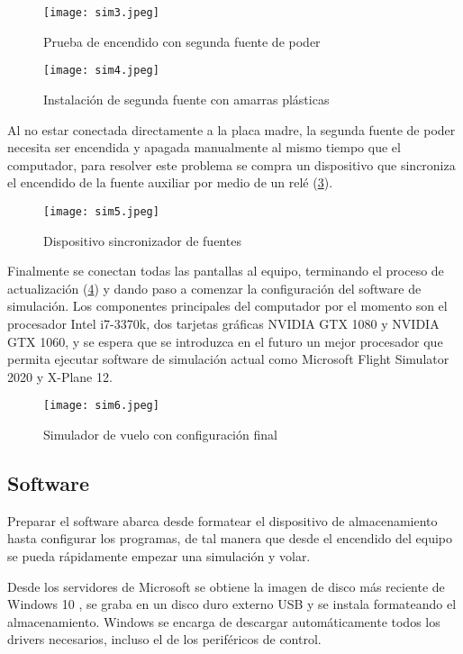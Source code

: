 \begin{figure}[h]
	\centering
	\texttt{[image: sim3.jpeg]}
	\caption{Prueba de encendido con segunda fuente de poder}
	\label{fig:sim3}
\end{figure}

\begin{figure}[h]
	\centering
	\texttt{[image: sim4.jpeg]}
	\caption{Instalación de segunda fuente con amarras plásticas}
	\label{fig:sim4}
\end{figure}

Al no estar conectada directamente a la placa madre, la segunda fuente de poder necesita ser encendida y apagada manualmente al mismo tiempo que el computador, para resolver este problema se compra un dispositivo que sincroniza el encendido de la fuente auxiliar por medio de un relé (\ref{fig:sim5}).

\begin{figure}[h]
	\centering
	\texttt{[image: sim5.jpeg]}
	\caption{Dispositivo sincronizador de fuentes}
	\label{fig:sim5}
\end{figure}

Finalmente se conectan todas las pantallas al equipo, terminando el proceso de actualización (\ref{fig:sim6}) y dando paso a comenzar la configuración del software de simulación. Los componentes principales del computador por el momento son el procesador Intel i7-3370k, dos tarjetas gráficas NVIDIA GTX 1080 y NVIDIA GTX 1060, y se espera que se introduzca en el futuro un mejor procesador que permita ejecutar software de simulación actual como Microsoft Flight Simulator 2020 y X-Plane 12.

\begin{figure}[h]
	\centering
	\texttt{[image: sim6.jpeg]}
	\caption{Simulador de vuelo con configuración final}
	\label{fig:sim6}
\end{figure}

\subsection{Software}

Preparar el software abarca desde formatear el dispositivo de almacenamiento hasta configurar los programas, de tal manera que desde el encendido del equipo se pueda rápidamente empezar una simulación y volar.

Desde los servidores de Microsoft se obtiene la imagen de disco más reciente de Windows 10 \cite{windows}, se graba en un disco duro externo USB y se instala formateando el almacenamiento. Windows se encarga de descargar automáticamente todos los drivers necesarios, incluso el de los periféricos de control.

